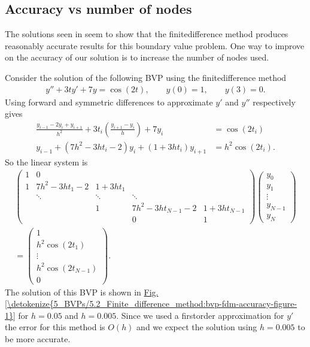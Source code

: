 \documentclass[letterpaper,10pt,english]{jupyterBook}
\begin{document}
\subsection{Accuracy vs number of nodes}
\label{\detokenize{5_BVPs/5.2_Finite_difference_method:accuracy-vs-number-of-nodes}}
\sphinxAtStartPar
The solutions seen in {\hyperref[\detokenize{5_BVPs/5.2_Finite_difference_method:bvp-finite-difference-example}]{}} seem to show that the finite\sphinxhyphen{}difference method produces reasonably accurate results for this boundary value problem. One way to improve on the accuracy of our solution is to increase the number of nodes used.

\sphinxAtStartPar
Consider the solution of the following BVP using the finite\sphinxhyphen{}difference method
\begin{align*}
    y'' + 3ty' + 7y = \cos (2t), \qquad y(0) = 1, \qquad y(3) = 0.
\end{align*}
\sphinxAtStartPar
Using forward and symmetric differences to approximate \(y'\) and \(y''\) respectively gives
\begin{align*}
    \frac{y_{i-1} - 2y_i + y_{i+1}}{h^2} + 3t_i \left( \frac{y_{i+1} - y_i}{h}\right) + 7y_i &= \cos(2t_i) \\
    y_{i-1} + (7h^2 - 3ht_i - 2)y_i + (1 + 3ht_i)y_{i+1} &= h^2 \cos(2t_i).
\end{align*}
\sphinxAtStartPar
So the linear system is
\begin{align*}
    \begin{pmatrix} 
        1 & 0 \\
        1 & 7h^2 - 3ht_1 - 2 & 1 + 3ht_1 \\
        & \ddots & \ddots & \ddots \\
        && 1 & 7h^2 - 3ht_{N-1} - 2 & 1 + 3ht_{N-1} \\
        &&& 0 & 1
    \end{pmatrix}
    \begin{pmatrix} y_0 \\ y_1 \\ \vdots \\ y_{N-1} \\ y_N \end{pmatrix} \\
    = \begin{pmatrix} 1 \\ h^2 \cos(2t_1) \\ \vdots \\ h^2 \cos(2t_{N-1}) \\ 0 \end{pmatrix}.
\end{align*}
\sphinxAtStartPar
The solution of this BVP is shown in \hyperref[\detokenize{5_BVPs/5.2_Finite_difference_method:bvp-fdm-accuracy-figure-1}]{Fig.\@ \ref{\detokenize{5_BVPs/5.2_Finite_difference_method:bvp-fdm-accuracy-figure-1}}} for \(h=0.05\) and \(h = 0.005\). Since we used a first\sphinxhyphen{}order approximation for \(y'\) the error for this method is \(O(h)\) and we expect the solution using \(h=0.005\) to be more accurate.
\end{document}
